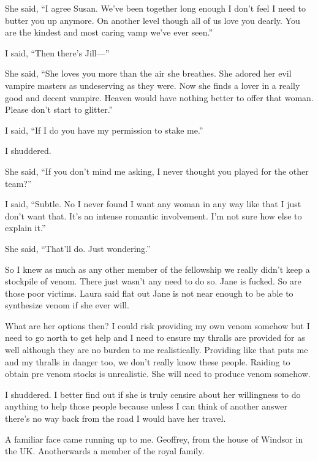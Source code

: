 She said, ``I agree Susan. We've been together long enough I don't feel I need to butter you up anymore. On another level though all of us love you dearly. You are the kindest and most caring vamp we've ever seen.''

I said, ``Then there's Jill---''

She said, ``She loves you more than the air she breathes. She adored her evil vampire masters as undeserving as they were. Now she finds a lover in a really good and decent vampire. Heaven would have nothing better to offer that woman. Please don't start to glitter.''

I said, ``If I do you have my permission to stake me.''

I shuddered.

She said, ``If you don't mind me asking, I never thought you played for the other team?''

I said, ``Subtle. No I never found I want any woman in any way like that I just don't want that. It's an intense romantic involvement. I'm not sure how else to explain it.''

She said, ``That'll do. Just wondering.''

So I knew as much as any other member of the fellowship we really didn't keep a stockpile of venom. There just wasn't any need to do so. Jane is fucked. So are those poor victims. Laura said flat out Jane is not near enough to be able to synthesize venom if she ever will.

What are her options then? I could risk providing my own venom somehow but I need to go north to get help and I need to ensure my thralls are provided for as well although they are no burden to me realistically. Providing like that puts me and my thralls in danger too, we don't really know these people. Raiding to obtain pre \chichenitza venom stocks is unrealistic. She will need to produce venom somehow.

I shuddered. I better find out if she is truly censire about her willingness to do anything to help those people because unless I can think of another answer there's no way back from the road I would have her travel.

















A familiar face came running up to me. Geoffrey, from the house of Windsor in the UK. Anotherwards a member of the royal family.

